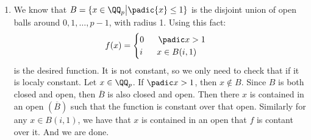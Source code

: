 \begin{enumerate}[label=]
    \item 
        We know that $B = \{x \in \QQ_p \big| \padic{x} \le 1 \}$ is the disjoint union of open balls around $0, 1, \dots, p - 1$, with radius 1. Using this fact:
        \begin{gather*}
            f(x) = \begin{cases}
                0 \ \ \ \ \ \padic x > 1 \\
                i \ \ \ \ \ x \in B(i, 1)
            \end{cases}
        \end{gather*}
        is the desired function. It is not constant, so we only need to check that if it is localy constant.
        Let $x \in \QQ_p$. If $\padic x > 1$, then $x \notin B$. Since $B$ is both closed and open, then $\overline{B}$ is also closed and open. Then there $x$ is contained in an open $(\overline{B})$ such that the function is constant over that open. Similarly for any $x \in B(i, 1)$, we have that $x$ is contained in an open that $f$ is contant over it. And we are done.
\end{enumerate}
